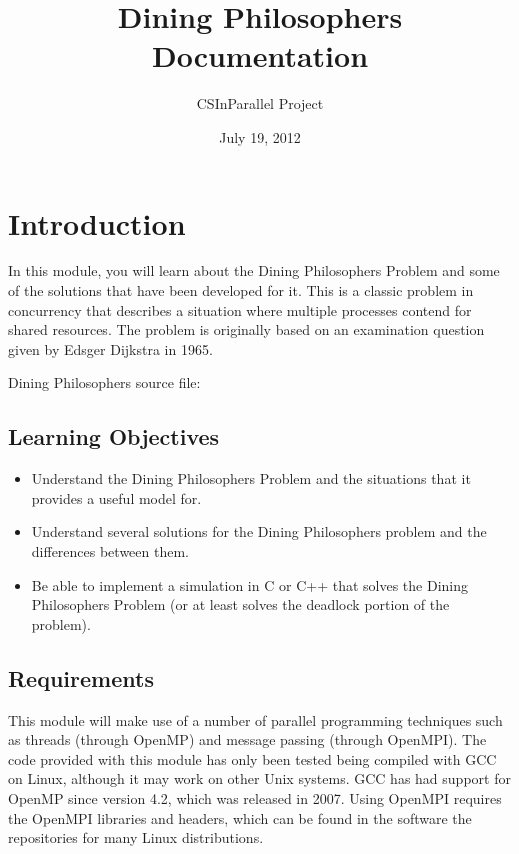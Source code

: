 \documentclass[letterpaper,10pt,openany,oneside]{sphinxmanual}
\title{Dining Philosophers Documentation}
\date{July 19, 2012}
\author{CSInParallel Project}
\begin{document}
\maketitle
\tableofcontents
{}\label{index::doc}



\chapter{Introduction}
\label{Introduction/Introduction:introduction}\label{Introduction/Introduction::doc}\label{Introduction/Introduction:dining-philosophers}
In this module, you will learn about the Dining Philosophers
Problem and some of the solutions that have been developed for it.
This is a classic problem in concurrency that describes a situation
where multiple processes contend for shared resources. The problem
is originally based on an examination question given by Edsger
Dijkstra in 1965.

Dining Philosophers source file:


\section{Learning Objectives}
\label{Introduction/Introduction:learning-objectives}\begin{itemize}
\item {} 
Understand the Dining Philosophers Problem and the situations
that it provides a useful model for.

\item {} 
Understand several solutions for the Dining Philosophers problem
and the differences between them.

\item {} 
Be able to implement a simulation in C or C++ that solves the
Dining Philosophers Problem (or at least solves the deadlock
portion of the problem).

\end{itemize}


\section{Requirements}
\label{Introduction/Introduction:requirements}
This module will make use of a number of parallel programming
techniques such as threads (through OpenMP) and message passing
(through OpenMPI). The code provided with this module has only been
tested being compiled with GCC on Linux, although it may work on
other Unix systems. GCC has had support for OpenMP since version
4.2, which was released in 2007. Using OpenMPI requires the OpenMPI
libraries and headers, which can be found in the software the
repositories for many Linux distributions.
\end{document}

